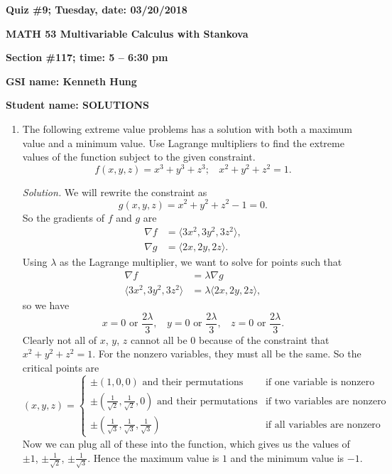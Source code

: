 \documentclass{article}
\begin{document}
{\bf Quiz \#9; Tuesday, date: 03/20/2018}

{\bf MATH 53 Multivariable Calculus with Stankova}

{\bf Section \#117; time: 5 -- 6:30 pm}

{\bf GSI name: Kenneth Hung}

{\bf Student name: SOLUTIONS}

\vspace*{0.25in}

\begin{enumerate}
\item The following extreme value problems has a solution with both a maximum value and a minimum value. Use Lagrange multipliers to find the extreme values of the function subject to the given constraint.
\[
f(x, y, z) = x^3 + y^3 + z^3; ~~~~ x^2 + y^2 + z^2 = 1.
\]

{\em Solution.} We will rewrite the constraint as
\[
g(x, y, z) = x^2 + y^2 + z^2 - 1 = 0.
\]
So the gradients of $f$ and $g$ are
\begin{align*}
\nabla f & = \langle 3x^2, 3y^2, 3z^2 \rangle, \\
\nabla g & = \langle 2x, 2y, 2z \rangle.
\end{align*}
Using $\lambda$ as the Lagrange multiplier, we want to solve for points such that
\begin{align*}
\nabla f & = \lambda \nabla g \\
\langle 3x^2, 3y^2, 3z^2 \rangle & = \lambda \langle 2x, 2y, 2z \rangle,
\end{align*}
so we have
\[
x = 0 \text{ or } \frac{2\lambda}{3}, ~~~~ y = 0 \text{ or } \frac{2\lambda}{3}, ~~~~ z = 0 \text{ or } \frac{2\lambda}{3}.
\]
Clearly not all of $x$, $y$, $z$ cannot all be $0$ because of the constraint that $x^2 + y^2 + z^2 = 1$. For the nonzero variables, they must all be the same. So the critical points are
\[
(x, y, z) = \begin{cases}
\pm (1, 0, 0) \text{ and their permutations} & \text{if one variable is nonzero} \\
\pm \left(\frac{1}{\sqrt{2}}, \frac{1}{\sqrt{2}}, 0\right) \text{ and their permutations} & \text{if two variables are nonzero} \\
\pm \left(\frac{1}{\sqrt{3}}, \frac{1}{\sqrt{3}}, \frac{1}{\sqrt{3}}\right) & \text{if all variables are nonzero}
\end{cases}
\]
Now we can plug all of these into the function, which gives us the values of $\pm 1$, $\pm \frac{1}{\sqrt{2}}$, $\pm \frac{1}{\sqrt{3}}$. Hence the maximum value is $1$ and the minimum value is $-1$.


\end{enumerate}
\end{document}
